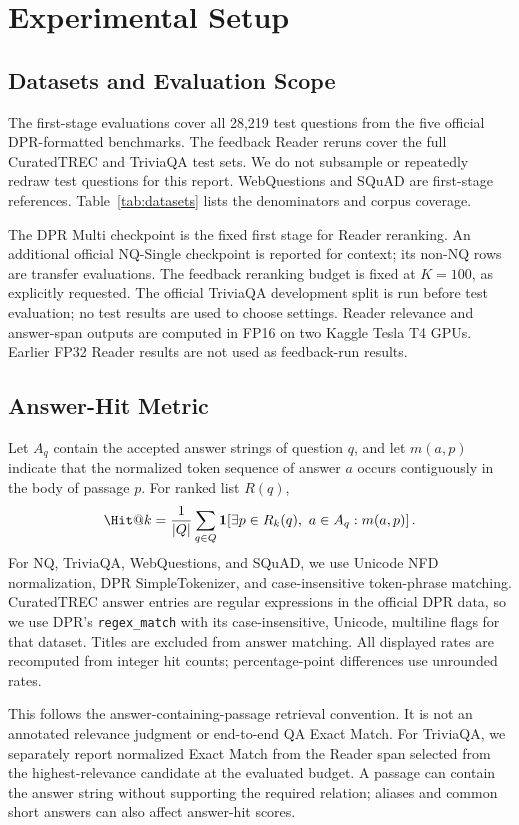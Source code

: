 \section{Experimental Setup}
\subsection{Datasets and Evaluation Scope}
The first-stage evaluations cover all 28,219 test questions from the five official DPR-formatted benchmarks. The feedback Reader reruns cover the full CuratedTREC and TriviaQA test sets. We do not subsample or repeatedly redraw test questions for this report. WebQuestions and SQuAD are first-stage references. Table~\ref{tab:datasets} lists the denominators and corpus coverage.



The DPR Multi checkpoint is the fixed first stage for Reader reranking. An additional official NQ-Single checkpoint is reported for context; its non-NQ rows are transfer evaluations. The feedback reranking budget is fixed at $K=100$, as explicitly requested. The official TriviaQA development split is run before test evaluation; no test results are used to choose settings. Reader relevance and answer-span outputs are computed in FP16 on two Kaggle Tesla T4 GPUs. Earlier FP32 Reader results are not used as feedback-run results.

\subsection{Answer-Hit Metric}
Let $A_q$ contain the accepted answer strings of question $q$, and let $m(a,p)$ indicate that the normalized token sequence of answer $a$ occurs contiguously in the body of passage $p$. For ranked list $R(q)$,
\begin{equation}
\Hit@k=\frac{1}{|Q|}\sum_{q\in Q}
\mathbf{1}\!\left[\exists p\in R_k(q),\ a\in A_q:m(a,p)\right].
\label{eq:hit}
\end{equation}
For NQ, TriviaQA, WebQuestions, and SQuAD, we use Unicode NFD normalization, DPR SimpleTokenizer, and case-insensitive token-phrase matching. CuratedTREC answer entries are regular expressions in the official DPR data, so we use DPR's \texttt{regex\_match} with its case-insensitive, Unicode, multiline flags for that dataset. Titles are excluded from answer matching. All displayed rates are recomputed from integer hit counts; percentage-point differences use unrounded rates.

This follows the answer-containing-passage retrieval convention. It is not an annotated relevance judgment or end-to-end QA Exact Match. For TriviaQA, we separately report normalized Exact Match from the Reader span selected from the highest-relevance candidate at the evaluated budget. A passage can contain the answer string without supporting the required relation; aliases and common short answers can also affect answer-hit scores.

